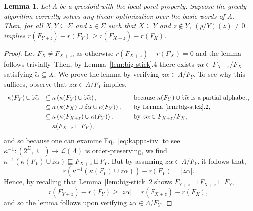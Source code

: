\documentclass[11pt]{article}
\newtheorem{lemma}[theorem]{Lemma}
\newcommand{\univ}{\Sigma}
\newcommand{\glang}{\Lambda}
\newcommand{\greedyrep}{\ddot{\rho}}
\providecommand{\L}{}
\renewcommand{\L}{\mathscr{L}}
\begin{document}
\begin{lemma}\label{lem:key-lemma}
    Let $\glang$ be a greedoid with the local poset property.
    Suppose the greedy algorithm correctly solves any linear optimization over the basic words of $\glang$.
    Then, for all $X,Y\subseteq\univ$ and $z \in \univ$ such that $X\subseteq Y$ and $z \notin Y$,
    $\left(\greedyrep/Y\right)(z)\neq 0$ implies $r(F_{Y+z}) - r(F_Y) \geq r(F_{X+z}) - r(F_X)$.
\end{lemma}
\begin{proof}
    Let $F_X \neq F_{X+z}$, as otherwise $r(F_{X+z}) - r(F_X) = 0$ and the lemma follows trivially.
    Then, by Lemma~\ref{lem:big-stick}.4 there exists $z\alpha\in F_{X+z}/F_X$ satisfying $\widetilde{\alpha}\subseteq X$.
    We prove the lemma by verifying $z\alpha \in \glang/F_Y$.
    To see why this suffices, observe that $z\alpha\in\glang/F_Y$ implies,
    \begin{equation*}
        \def\arraystretch{1.25}
        \begin{array}{lll}
            \kappa(F_Y)\cup\widetilde{z\alpha} &\subseteq \kappa\left(\kappa(F_Y)\cup\widetilde{z\alpha}\right),\quad&\text{because  $\kappa(F_Y)\cup\widetilde{z\alpha}$ is a partial alphabet},\\
                                               &\subseteq \kappa\left(\kappa(F_X)\cup\widetilde{z\alpha}\cup\kappa(F_Y)\right),\quad&\text{by Lemma~\ref{lem:big-stick}.2},\\
                                               &\subseteq \kappa\left(\kappa(F_{X+z})\cup\kappa(F_Y)\right),\quad&\text{by $z\alpha\in F_{X+z}/F_X$},\\
                                               &= \kappa(F_{X+z}\sqcup F_Y),
        \end{array}
    \end{equation*}
    and so because one can examine Eq.~\ref{eq:kappa-inv} to see $\kappa^{-1}:\left(2^\univ,\subseteq\right)\to\L(\glang)$ is order-preserving, we find $\kappa^{-1}(\kappa(F_Y)\cup\widetilde{z\alpha}) \sqsubseteq F_{X+z}\sqcup F_Y$.
    But by assuming $z\alpha\in\glang/F_Y$, it follows that,
    $$r(\kappa^{-1}(\kappa(F_Y)\cup\widetilde{z\alpha})) - r(F_Y) = |z\alpha|.$$
    Hence, by recalling that Lemma~\ref{lem:big-stick}.2 shows $F_{Y+z} \sqsupseteq F_{X+z} \sqcup F_Y$,
    \[
        r(F_{Y+z}) - r(F_Y) \geq |z\alpha| = r(F_{X+z})-r(F_X),
    \]
    and so the lemma follows upon verifying $z\alpha\in\glang/F_Y$.


\end{proof}
\end{document}
